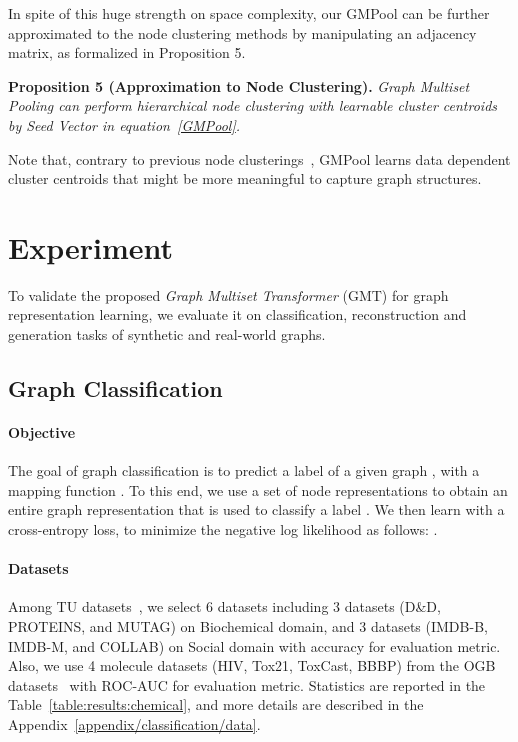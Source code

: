 \documentclass{article} \usepackage{iclr2021_conference,times}
\begin{document}
In spite of this huge strength on space complexity, our GMPool can be further approximated to the node clustering methods by manipulating an adjacency matrix, as formalized in Proposition 5.

\textbf{Proposition 5 (Approximation to Node Clustering).} \emph{Graph Multiset Pooling  can perform hierarchical node clustering with learnable  cluster centroids by Seed Vector  in equation~\ref{GMPool}.}

Note that, contrary to previous node clusterings~\citep{DiffPool, MincutPool}, GMPool learns data dependent  cluster centroids that might be more meaningful to capture graph structures.
 \section{Experiment}
To validate the proposed \emph{Graph Multiset Transformer} (GMT) for graph representation learning, we evaluate it on classification, reconstruction and generation tasks of synthetic and real-world graphs.

\subsection{Graph Classification}
\paragraph{Objective}
The goal of graph classification is to predict a label  of a given graph , with a mapping function . To this end, we use a set of node representations  to obtain an entire graph representation  that is used to classify a label . We then learn  with a cross-entropy loss, to minimize the negative log likelihood as follows: .

\paragraph{Datasets} 
Among TU datasets~\citep{classification/datasets}, we select 6 datasets including 3 datasets (D\&D, PROTEINS, and MUTAG) on Biochemical domain, and 3 datasets (IMDB-B, IMDB-M, and COLLAB) on Social domain with accuracy for evaluation metric. Also, we use 4 molecule datasets (HIV, Tox21, ToxCast, BBBP) from the OGB datasets~\citep{OGB} with ROC-AUC for evaluation metric. Statistics are reported in the Table~\ref{table:results:chemical}, and more details are described in the Appendix~\ref{appendix/classification/data}.

\vspace{-0.03in}
\end{document}
